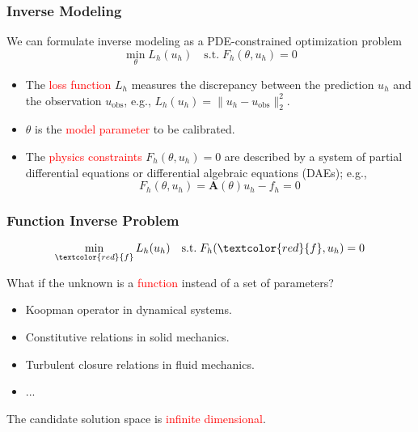\documentclass[usenames,dvipsnames]{beamer}
\begin{document}
\begin{frame}
	\frametitle{Inverse Modeling}
	We can formulate inverse modeling as a PDE-constrained optimization problem 
	\begin{equation*}
		\min_{\theta} L_h(u_h) \quad \mathrm{s.t.}\; F_h(\theta, u_h) = 0
	\end{equation*}
	\begin{itemize}
		\item The \textcolor{red}{loss function} $L_h$ measures the discrepancy between the prediction $u_h$ and the observation $u_{\mathrm{obs}}$, e.g., $L_h(u_h) = \|u_h - u_{\mathrm{obs}}\|_2^2$. 
		\item $\theta$ is the \textcolor{red}{model parameter} to be calibrated. 
		\item The \textcolor{red}{physics constraints} $F_h(\theta, u_h)=0$ are described by a system of partial differential equations or differential algebraic equations (DAEs); e.g., 
		$$F_h(\theta, u_h) = \mathbf{A}(\theta) u_h - f_h = 0$$
	\end{itemize}
\end{frame}




\begin{frame}
	\frametitle{Function Inverse Problem}
	
	\begin{equation*}
		\min_{\textcolor{red}{f}} L_h(u_h) \quad \mathrm{s.t.}\; F_h(\textcolor{red}{f}, u_h) = 0
	\end{equation*}
	
	What if the unknown is a \textcolor{red}{function} instead of a set of parameters?
\begin{itemize}
	\item Koopman operator in dynamical systems.
	\item Constitutive relations in solid mechanics. 
	\item Turbulent closure relations in fluid mechanics.
	\item ...
\end{itemize}

The candidate solution space is \textcolor{red}{infinite dimensional}.

\end{frame}
\end{document}
